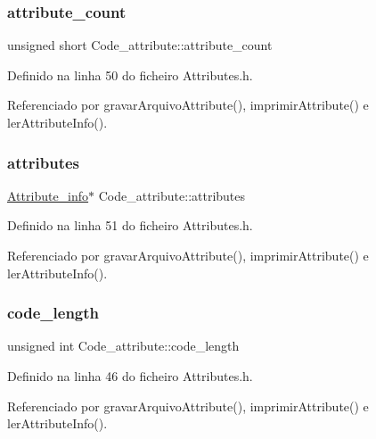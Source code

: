 \subsubsection{\texorpdfstring{attribute\+\_\+count}{attribute\_count}}
{\footnotesize\ttfamily unsigned short Code\+\_\+attribute\+::attribute\+\_\+count}



Definido na linha 50 do ficheiro Attributes.\+h.



Referenciado por gravar\+Arquivo\+Attribute(), imprimir\+Attribute() e ler\+Attribute\+Info().

\mbox{\label{structCode__attribute_ad42c1c926ade7cce485bed5e59184049}} 
\subsubsection{\texorpdfstring{attributes}{attributes}}
{\footnotesize\ttfamily \hyperlink{structAttribute__info}{Attribute\+\_\+info}$\ast$ Code\+\_\+attribute\+::attributes}



Definido na linha 51 do ficheiro Attributes.\+h.



Referenciado por gravar\+Arquivo\+Attribute(), imprimir\+Attribute() e ler\+Attribute\+Info().

\mbox{\label{structCode__attribute_a2e5718559f43a06fcdea23b2bb289c5b}} 
\subsubsection{\texorpdfstring{code\+\_\+length}{code\_length}}
{\footnotesize\ttfamily unsigned int Code\+\_\+attribute\+::code\+\_\+length}



Definido na linha 46 do ficheiro Attributes.\+h.



Referenciado por gravar\+Arquivo\+Attribute(), imprimir\+Attribute() e ler\+Attribute\+Info().

